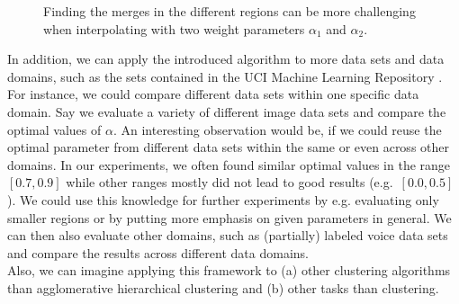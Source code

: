 \begin{figure}[h]
\centering
{}
\caption{Finding the merges in the different regions can be more challenging when interpolating with two weight parameters $\alpha_1$ and $\alpha_2$.}
\label{fig:convexhulls2}
\end{figure}

In addition, we can apply the introduced algorithm to more data sets and data domains, such as the sets contained in the UCI Machine Learning Repository \cite{Dua:2019}. For instance, we could compare different data sets within one specific data domain. Say we evaluate a variety of different image data sets and compare the optimal values of $\alpha$. An interesting observation would be, if we could reuse the optimal parameter from different data sets within the same or even across other domains. In our experiments, we often found similar optimal values in the range $[0.7,0.9]$ while other ranges mostly did not lead to good results (e.g.\ $[0.0, 0.5]$). We could use this knowledge for further experiments by e.g. evaluating only smaller regions or by putting more emphasis on given parameters in general. We can then also evaluate other domains, such as (partially) labeled voice data sets and compare the results across different data domains.\\

Also, we can imagine applying this framework to (a) other clustering algorithms than agglomerative hierarchical clustering and (b) other tasks than clustering.